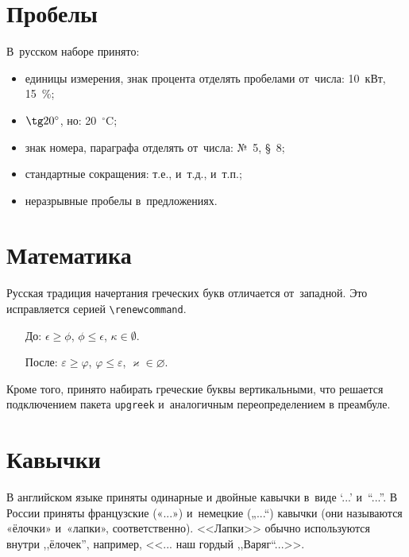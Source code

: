 \section{Пробелы}

В~русском наборе принято:
\begin{itemize}
    \item единицы измерения, знак процента отделять пробелами от~числа: 10~кВт, 15~\%;
    \item $\tg 20^\circ$, но: 20~${}^\circ$C;
    \item знак номера, параграфа отделять от~числа: №~5, \S~8;
    \item стандартные сокращения: т.\:е., и~т.\:д., и~т.\:п.;
    \item неразрывные пробелы в~предложениях.
\end{itemize}

\section{Математика}

Русская традиция начертания греческих букв отличается от~западной. Это исправляется серией \verb|\renewcommand|.
\begin{itemize}
    \item[До:] $ \epsilon \ge \phi$, $\phi \leq \epsilon$, $\kappa \in \emptyset$.
    \renewcommand{\epsilon}{\ensuremath{\varepsilon}}
    \renewcommand{\phi}{\ensuremath{\varphi}}
    \renewcommand{\kappa}{\ensuremath{\varkappa}}
    \renewcommand{\le}{\ensuremath{\leqslant}}
    \renewcommand{\leq}{\ensuremath{\leqslant}}
    \renewcommand{\ge}{\ensuremath{\geqslant}}
    \renewcommand{\geq}{\ensuremath{\geqslant}}
    \renewcommand{\emptyset}{\varnothing}
    \item[После:] $\epsilon \ge \phi$, $\phi \leq \epsilon$, $\kappa \in \emptyset$.
\end{itemize}

Кроме того, принято набирать греческие буквы вертикальными, что решается подключением пакета \verb|upgreek| и~аналогичным переопределением в преамбуле.


\section{Кавычки}
В английском языке приняты одинарные и двойные кавычки в~виде ‘...’ и~“...”. В России приняты французские («...») и~немецкие („...“) кавычки (они называются «ёлочки» и~«лапки», соответственно). <<Лапки>> обычно используются внутри ,,ёлочек'', например, <<... наш гордый ,,Варяг``...>>.

